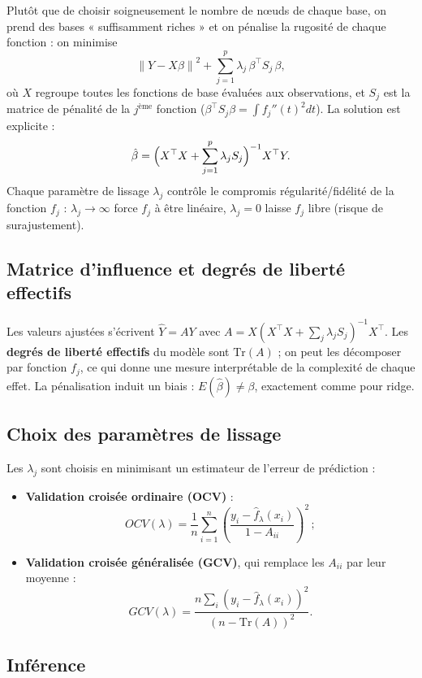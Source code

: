 \documentclass[
  french,
  letterpaper,
  DIV=11,
  numbers=noendperiod]{scrreprt}
\begin{document}
Plutôt que de choisir soigneusement le nombre de nœuds de chaque base,
on prend des bases « suffisamment riches » et on pénalise la rugosité de
chaque fonction : on minimise
\[\left\|Y - X\beta\right\|^2 + \sum_{j=1}^p\lambda_j\,\beta^\top S_j\,\beta,\]
où \(X\) regroupe toutes les fonctions de base évaluées aux
observations, et \(S_j\) est la matrice de pénalité de la
\(j^{\text{ème}}\) fonction
(\(\beta^\top S_j\beta = \int f_j''(t)^2dt\)). La solution est explicite
:
\[\hat\beta = \Bigl(X^\top X + \sum_{j=1}^p\lambda_j S_j\Bigr)^{-1}X^\top Y.\]
Chaque paramètre de lissage \(\lambda_j\) contrôle le compromis
régularité/fidélité de la fonction \(f_j\) : \(\lambda_j\to\infty\)
force \(f_j\) à être linéaire, \(\lambda_j = 0\) laisse \(f_j\) libre
(risque de surajustement).

\subsection{Matrice d'influence et degrés de liberté
effectifs}\label{matrice-dinfluence-et-degruxe9s-de-libertuxe9-effectifs}

Les valeurs ajustées s'écrivent \(\hat Y = AY\) avec
\(A = X(X^\top X + \sum_j\lambda_j S_j)^{-1}X^\top\). Les \textbf{degrés
de liberté effectifs} du modèle sont \(\mathrm{Tr}(A)\) ; on peut les
décomposer par fonction \(f_j\), ce qui donne une mesure interprétable
de la complexité de chaque effet. La pénalisation induit un biais :
\(E(\hat\beta)\neq\beta\), exactement comme pour ridge.

\subsection{Choix des paramètres de
lissage}\label{choix-des-paramuxe8tres-de-lissage}

Les \(\lambda_j\) sont choisis en minimisant un estimateur de l'erreur
de prédiction :

\begin{itemize}
\item
  \textbf{Validation croisée ordinaire (OCV)} :
  \[OCV(\lambda) = \frac{1}{n}\sum_{i=1}^n\left(\frac{y_i - \hat f_\lambda(x_i)}{1 - A_{ii}}\right)^2\,;\]
\item
  \textbf{Validation croisée généralisée (GCV)}, qui remplace les
  \(A_{ii}\) par leur moyenne :
  \[GCV(\lambda) = \frac{n\sum_i(y_i - \hat f_\lambda(x_i))^2}{\left(n - \mathrm{Tr}(A)\right)^2}.\]
\end{itemize}

\subsection{Inférence}\label{infuxe9rence}
\end{document}
